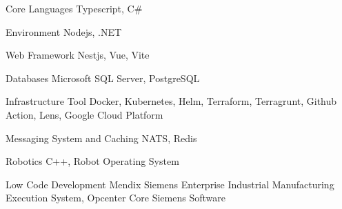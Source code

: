 

\begin{cvskills}
  \cvskill
    {Core Languages} %
    {Typescript, C\#} %

  \cvskill
    {Environment} %
    {Nodejs, .NET} %

  \cvskill
    {Web Framework} %
    {Nestjs, Vue, Vite} %

  \cvskill
    {Databases} %
    {Microsoft SQL Server, PostgreSQL} %

  \cvskill
    {Infrastructure Tool} %
    {Docker, Kubernetes, Helm, Terraform, Terragrunt, Github Action, Lens, Google Cloud Platform } %

  \cvskill
    {Messaging System and Caching} %
    {NATS, Redis} %

  \cvskill
    {Robotics} %
    {C++, Robot Operating System} %

  \cvskill
    {Low Code Development} %
    {Mendix Siemens} %
  \cvskill
    {Enterprise Industrial} %
    {Manufacturing Execution System, Opcenter Core Siemens Software} %

\end{cvskills}
